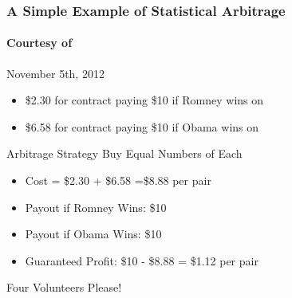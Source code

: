 \documentclass[handout]{beamer}
\begin{document}
\begin{frame}
\frametitle{A Simple Example of Statistical Arbitrage}
\framesubtitle{Courtesy of  }

\begin{block}{November 5th, 2012}
	\begin{itemize}
		\item\$2.30 for contract paying \$10 if Romney wins on  	
		\item \$6.58 for contract paying \$10 if Obama wins on 
	\end{itemize}
\end{block}

\begin{alertblock}{Arbitrage Strategy}\pause
Buy Equal Numbers of Each \pause
	\begin{itemize}
		\item Cost = \$2.30 + \$6.58 =\$8.88 per pair \pause
		\item Payout if Romney Wins: \$10 \pause
		\item Payout if Obama Wins: \$10 \pause
		\item Guaranteed Profit: \$10 - \$8.88 = \$1.12 per pair
	\end{itemize} 

\end{alertblock}



\end{frame}
\begin{frame}
\centering \Huge Four Volunteers Please!

\end{frame}
\end{document}
